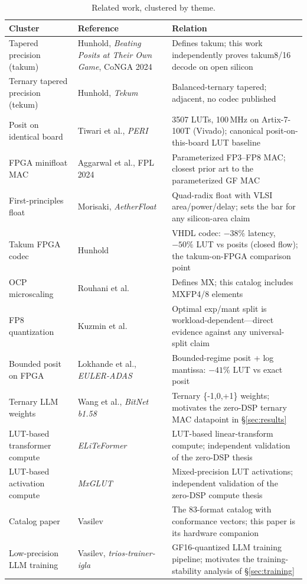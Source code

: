 \documentclass[11pt]{article}
\begin{document}
\begin{table}[h]
\centering
\small
\caption{Related work, clustered by theme.}
\label{tab:related}
\begin{tabularx}{\textwidth}{p{3.2cm} p{5.6cm} X}
\toprule
Cluster & Reference & Relation \\
\midrule
Tapered precision (takum)
  & Hunhold, \emph{Beating Posits at Their Own Game}, CoNGA 2024~\cite{hunhold2024takum}
  & Defines takum; this work independently proves takum8/16 decode on open silicon \\
Ternary tapered precision (tekum)
  & Hunhold, \emph{Tekum}~\cite{hunhold2025tekum}
  & Balanced-ternary tapered; adjacent, no codec published \\
Posit on identical board
  & Tiwari et al., \emph{PERI}~\cite{tiwari2019peri}
  & 3507 LUTs, 100\,MHz on Artix-7-100T (Vivado); canonical posit-on-this-board LUT baseline \\
FPGA minifloat MAC
  & Aggarwal et al., FPL 2024~\cite{aggarwal2024minifloat}
  & Parameterized FP3--FP8 MAC; closest prior art to the parameterized GF MAC \\
First-principles float
  & Morisaki, \emph{AetherFloat}~\cite{morisaki2026aetherfloat}
  & Quad-radix float with VLSI area/power/delay; sets the bar for any silicon-area claim \\
Takum FPGA codec
  & Hunhold~\cite{hunhold2024takumcodec}
  & VHDL codec: $-38\%$ latency, $-50\%$ LUT vs posits (closed flow); the takum-on-FPGA comparison point \\
OCP microscaling
  & Rouhani et al.~\cite{rouhani2023mx}
  & Defines MX; this catalog includes MXFP4/8 elements \\
FP8 quantization
  & Kuzmin et al.~\cite{kuzmin2022fp8quant}
  & Optimal exp/mant split is workload-dependent---direct evidence against any universal-split claim \\
Bounded posit on FPGA
  & Lokhande et al., \emph{EULER-ADAS}~\cite{lokhande2026euleradas}
  & Bounded-regime posit + log mantissa: $-41\%$ LUT vs exact posit \\
Ternary LLM weights
  & Wang et al., \emph{BitNet b1.58}~\cite{wang2024bitnet}
  & Ternary \{-1,0,+1\} weights; motivates the zero-DSP ternary MAC datapoint in \S\ref{sec:results} \\
LUT-based transformer compute
  & \emph{ELiTeFormer}~\cite{eliformer2026}
  & LUT-based linear-transform compute; independent validation of the zero-DSP thesis \\
LUT-based activation compute
  & \emph{MxGLUT}~\cite{mxglut2026}
  & Mixed-precision LUT activations; independent validation of the zero-DSP compute thesis \\
Catalog paper
  & Vasilev~\cite{vasilev2026catalog}
  & The 83-format catalog with conformance vectors; this paper is its hardware companion \\
Low-precision LLM training
  & Vasilev, \emph{trios-trainer-igla}~\cite{vasilev2026igla}
  & GF16-quantized LLM training pipeline; motivates the training-stability analysis of \S\ref{sec:training} \\
\bottomrule
\end{tabularx}
\end{table}
\end{document}

